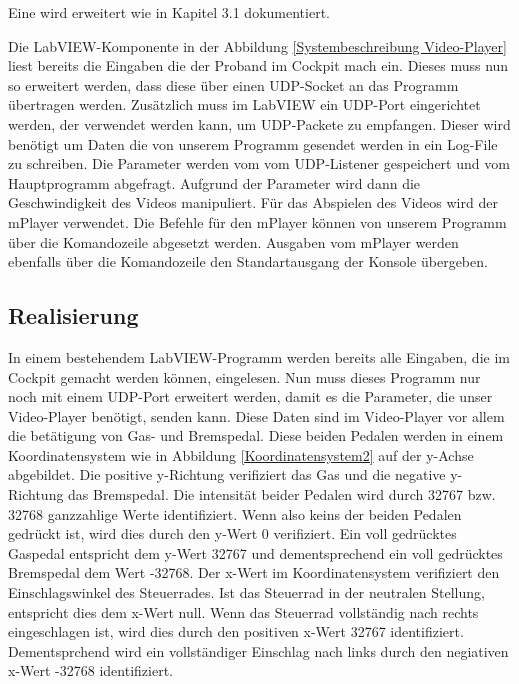 Eine wird erweitert wie in Kapitel 3.1 dokumentiert. 


Die LabVIEW-Komponente in der Abbildung \ref{Systembeschreibung Video-Player} liest bereits die Eingaben die der Proband im Cockpit mach ein. Dieses muss nun so erweitert werden, dass diese über einen UDP-Socket an das Programm übertragen werden. Zusätzlich muss im LabVIEW ein UDP-Port eingerichtet werden, der verwendet werden kann, um UDP-Packete zu empfangen. Dieser wird benötigt um Daten die von unserem Programm gesendet werden in ein Log-File zu schreiben.
Die Parameter werden vom vom UDP-Listener gespeichert und vom Hauptprogramm abgefragt. Aufgrund der Parameter wird dann die Geschwindigkeit des Videos manipuliert. Für das Abspielen des Videos wird der mPlayer verwendet. Die Befehle für den mPlayer können von unserem Programm über die Komandozeile abgesetzt werden. Ausgaben vom mPlayer  werden ebenfalls über die Komandozeile den Standartausgang der Konsole übergeben. 

\subsection{Realisierung}
In einem bestehendem LabVIEW-Programm werden bereits alle Eingaben, die im Cockpit gemacht werden können, eingelesen. Nun muss dieses Programm nur noch mit einem UDP-Port erweitert werden, damit es die Parameter, die unser Video-Player benötigt, senden kann. Diese Daten sind im Video-Player vor allem die betätigung von Gas- und Bremspedal. Diese beiden Pedalen werden in einem Koordinatensystem wie in Abbildung \ref{Koordinatensystem2} auf der y-Achse abgebildet. Die positive y-Richtung verifiziert das Gas und die negative y-Richtung das Bremspedal. Die intensität beider Pedalen wird durch 32767 bzw. 32768 ganzzahlige Werte identifiziert. Wenn also keins der beiden Pedalen gedrückt ist, wird dies durch den y-Wert 0 verifiziert. Ein voll gedrücktes Gaspedal entspricht dem y-Wert 32767 und dementsprechend ein voll gedrücktes Bremspedal dem Wert -32768. Der x-Wert im Koordinatensystem verifiziert den Einschlagswinkel des Steuerrades. Ist das Steuerrad in der neutralen Stellung, entspricht dies dem x-Wert null. Wenn das Steuerrad vollständig nach rechts eingeschlagen ist, wird dies durch den positiven x-Wert 32767 identifiziert. Dementsprchend wird ein vollständiger Einschlag nach links durch den negiativen x-Wert -32768 identifiziert. \\

